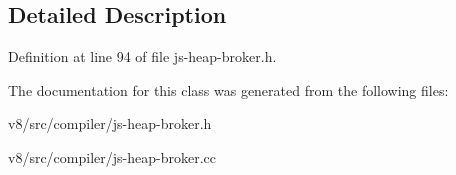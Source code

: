 \subsection{Detailed Description}


Definition at line 94 of file js-\/heap-\/broker.\+h.



The documentation for this class was generated from the following files\+:\begin{DoxyCompactItemize}
\item 
v8/src/compiler/js-\/heap-\/broker.\+h\item 
v8/src/compiler/js-\/heap-\/broker.\+cc\end{DoxyCompactItemize}
